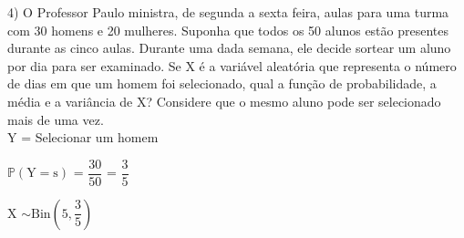\documentclass[12pt,a4paper,draft]{article}
\begin{document}
	\vspace{1cm}
	4) O Professor Paulo ministra, de segunda a sexta feira, aulas para uma turma com 30 homens e 20 mulheres. Suponha que todos os 50 alunos estão presentes durante as cinco aulas. Durante uma dada semana, ele decide sortear um aluno por dia para ser examinado. Se X é a variável aleatória que representa o número de dias em que um homem foi selecionado, qual a função de probabilidade, a média e a variância
	de X? Considere que o mesmo aluno pode ser selecionado mais de uma vez.
	\vspace{0.5cm}\\
	Y = Selecionar um homem
	\begin{center}
		\vspace{1cm}
		$\mathbb{P}\left(\text{Y} = \text{s}\right)$ = $\dfrac{30}{50}$ = $\dfrac{3}{5}$
		\vspace{1cm}\\
	\end{center}
	X $\sim \text{Bin}\left(5, \dfrac{3}{5}\right)$
	\vspace{1cm}\\
\end{document}
